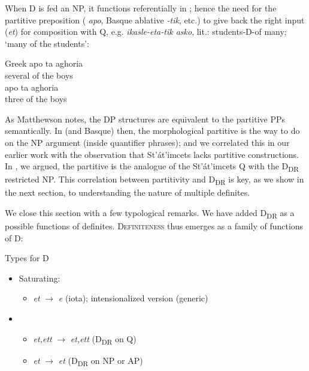 \documentclass[output=paper,
modfonts
]{langscibook}
\begin{document}
When D is fed an NP, it functions referentially in ; hence the need for the partitive preposition ( \textit{apo}, Basque ablative \textit{-tik}, etc.) to give back the right input (\textit{et}) for composition with Q, e.g. \textit{ikasle-eta-tik asko}, lit.: students-D-of many; `many of the students':

\ea\label{ex:etxeberria:40}
Greek 
\ea 
{} {apo} {ta} {aghoria} \\
several of the boys\\
\ex
{} {apo} {ta} {aghoria}\\
three of the boys\\
\z
\z

As Matthewson notes, the  DP structures are equivalent to the partitive PPs semantically. In  (and Basque) then, the morphological partitive is the way to do  on the NP argument (inside quantifier phrases); and we correlated this in our earlier work with the observation that St'\'at'imcets lacks partitive constructions. In , we argued, the partitive is the analogue of the St'\'at'imcets Q with the D\textsubscript{DR} restricted NP. This correlation between partitivity and D\textsubscript{DR} is key, as we show in the next section, to understanding the nature of multiple definites. 

We close this section with a few typological remarks. We have added D\textsubscript{DR} as a possible functions of definites. \textsc{Definiteness} thus emerges as a family of functions of D: 

\ea\label{ex:etxeberria:41}
	{Types for D}
	\begin{itemize}
	\item {Saturating:} 
		\begin{itemize}
			\item \textit{et} $\rightarrow$ \textit{e} (iota); intensionalized version (generic)
		\end{itemize} 
		\item {}
		\begin{itemize}
			\item \textit{et,ett} $\rightarrow$ \textit{et,ett} (D\textsubscript{DR} on Q)
			\item \textit{et} $\rightarrow$ \textit{et} (D\textsubscript{DR} on NP or AP)
		\end{itemize}
	\end{itemize}
\z
\end{document}
